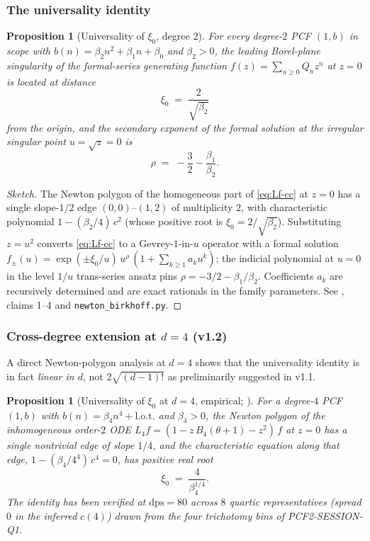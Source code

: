 \documentclass[11pt,reqno]{amsart}
\theoremstyle{plain}
\newtheorem{proposition}[theorem]{Proposition}
\theoremstyle{definition}
\theoremstyle{remark}
\begin{document}
\subsubsection*{The universality identity}

\begin{proposition}[Universality of $\xi_0$, degree $2$]
\label{prop:xi0}
For every degree-$2$ PCF $(1, b)$ in scope with
$b(n) = \beta_2 n^2 + \beta_1 n + \beta_0$ and $\beta_2 > 0$,
the leading Borel-plane singularity of the formal-series
generating function $f(z) = \sum_{n \ge 0} Q_n z^n$ at
$z=0$ is located at distance
\[
  \xi_0 \;=\; \frac{2}{\sqrt{\beta_2}}
\]
from the origin, and the secondary exponent of the formal
solution at the irregular singular point $u = \sqrt z = 0$ is
\[
  \rho \;=\; -\frac{3}{2} - \frac{\beta_1}{\beta_2}.
\]
\end{proposition}

\begin{proof}[Sketch]
The Newton polygon of the homogeneous part of
\eqref{eq:Lf-cc} at $z=0$ has a single slope-$1/2$ edge
$(0,0)$--$(1,2)$ of multiplicity $2$, with characteristic
polynomial $1 - (\beta_2/4)\,c^2$ (whose positive root is
$\xi_0 = 2/\sqrt{\beta_2}$). Substituting $z = u^2$ converts
\eqref{eq:Lf-cc} to a Gevrey-$1$-in-$u$ operator with a
formal solution
$f_\pm(u) = \exp(\pm \xi_0 / u) \, u^{\rho}\,(1+\sum_{k \ge 1}
a_k u^k)$; the indicial polynomial at $u=0$ in the level
$1/u$ trans-series ansatz pins
$\rho = -3/2 - \beta_1/\beta_2$. Coefficients $a_k$ are
recursively determined and are exact rationals in the family
parameters. See \cite{siarc_cc_pipeline_g}, claims 1--4 and
\texttt{newton\_birkhoff.py}.
\end{proof}

\subsubsection*{Cross-degree extension at $d=4$ (v1.2)}

A direct Newton-polygon analysis at $d=4$
\cite{siarc_pcf2_session_q1} shows that the universality
identity is in fact \emph{linear in $d$}, not
$2\sqrt{(d-1)!}$ as preliminarily suggested in v1.1.

\begin{proposition}[Universality of $\xi_0$ at $d=4$, empirical;
\cite{siarc_pcf2_session_q1}]
\label{prop:xi0-d4}
For a degree-$4$ PCF $(1, b)$ with
$b(n) = \beta_4 n^4 + \mathrm{l.o.t.}$ and $\beta_4 > 0$, the
Newton polygon of the inhomogeneous order-$2$ ODE
$L_4 f = (1 - z\,B_4(\theta+1) - z^2)\,f$ at $z=0$ has a
single nontrivial edge of slope $1/4$, and the
characteristic equation along that edge,
$1 - (\beta_4/4^4)\,c^4 = 0$, has positive real root
\[
  \xi_0 \;=\; \frac{4}{\beta_4^{1/4}}.
\]
The identity has been verified at $\mathrm{dps}=80$ across
$8$ quartic representatives (spread $0$ in the inferred
$c(4)$) drawn from the four trichotomy bins of
PCF2-SESSION-Q1.
\end{proposition}
\end{document}
